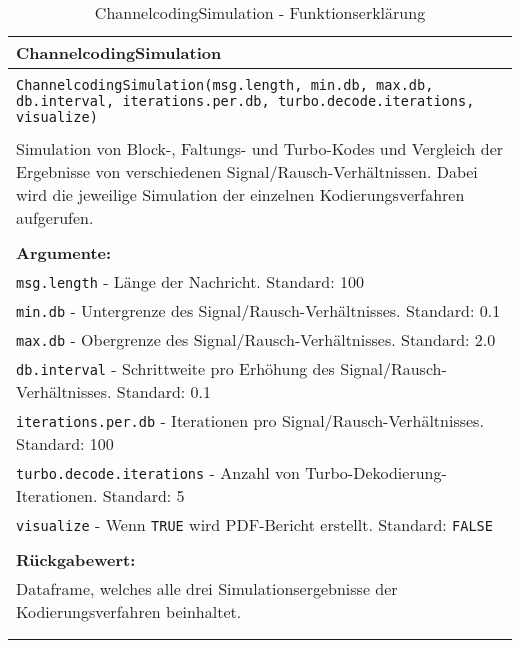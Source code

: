 \begin{longtable}{|p{\textwidth}|}
\hline
\rowcolor{lightblue}ChannelcodingSimulation\\
\hline
\\
\texttt{ChannelcodingSimulation(msg.length, min.db, max.db, db.interval, iterations.per.db, turbo.decode.iterations, visualize)}\\
\\
Simulation von Block-, Faltungs- und Turbo-Kodes und Vergleich der Ergebnisse von verschiedenen Signal/Rausch-Verhältnissen. Dabei wird die jeweilige Simulation der einzelnen Kodierungsverfahren aufgerufen.\\
\\
\textbf{Argumente:}\\
\texttt{msg.length} - Länge der Nachricht. Standard: 100\\
\texttt{min.db} - Untergrenze des Signal/Rausch-Verhältnisses. Standard: 0.1\\
\texttt{max.db} - Obergrenze des Signal/Rausch-Verhältnisses. Standard: 2.0\\
\texttt{db.interval} - Schrittweite pro Erhöhung des Signal/Rausch-Verhältnisses. Standard: 0.1\\
\texttt{iterations.per.db} - Iterationen pro Signal/Rausch-Verhältnisses. Standard: 100\\
\texttt{turbo.decode.iterations} - Anzahl von Turbo-Dekodierung-Iterationen. Standard: 5\\
\texttt{visualize} - Wenn \texttt{TRUE} wird PDF-Bericht erstellt. Standard: \texttt{FALSE}\\
\\
\textbf{Rückgabewert:}\\
Dataframe, welches alle drei Simulationsergebnisse der Kodierungsverfahren beinhaltet.\\
\\
\hline
\caption[ChannelcodingSimulation]{ChannelcodingSimulation - Funktionserklärung}
\end{longtable}